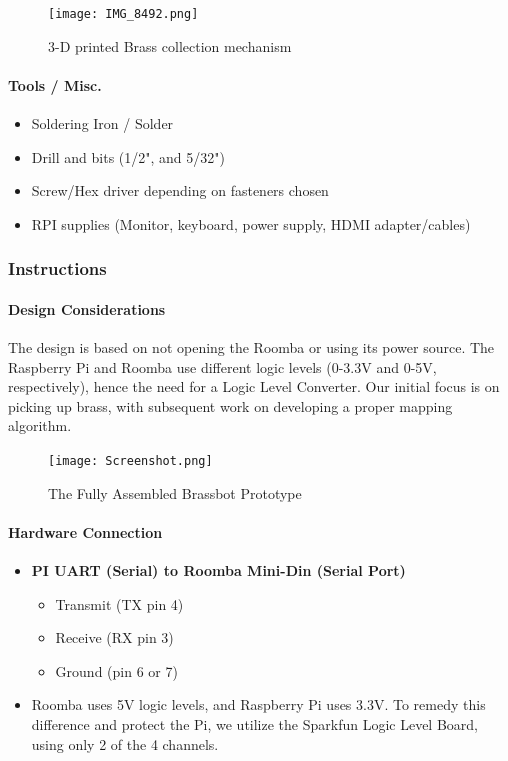 \documentclass{scrarticle}
\begin{document}
\begin{figure}
    \centering
    \texttt{[image: IMG\_8492.png]}
    \caption{3-D printed Brass collection mechanism}
    \label{Figure 3}
\end{figure}

\paragraph{Tools / Misc.}
\begin{itemize}
    \item Soldering Iron / Solder
    \item Drill and bits (1/2", and 5/32")
    \item Screw/Hex driver depending on fasteners chosen
    \item RPI supplies (Monitor, keyboard, power supply, HDMI adapter/cables)
\end{itemize}

\subsubsection{Instructions}

\paragraph{Design Considerations}
The design is based on not opening the Roomba or using its power source. The Raspberry Pi and Roomba use different logic levels (0-3.3V and 0-5V, respectively), hence the need for a Logic Level Converter. Our initial focus is on picking up brass, with subsequent work on developing a proper mapping algorithm.
\begin{figure}
    \centering
    \texttt{[image: Screenshot.png]}
    \caption{The Fully Assembled Brassbot Prototype}
    \label{Figure 4}
\end{figure}
\paragraph{Hardware Connection}
\begin{itemize}
    \item \textbf{PI UART (Serial) to Roomba Mini-Din (Serial Port)}
        \begin{itemize}
            \item Transmit (TX pin 4)
            \item Receive (RX pin 3)
            \item Ground (pin 6 or 7)
        \end{itemize}
    \item Roomba uses 5V logic levels, and Raspberry Pi uses 3.3V. To remedy this difference and protect the Pi, we utilize the Sparkfun Logic Level Board, using only 2 of the 4 channels.
\end{itemize}
\end{document}
